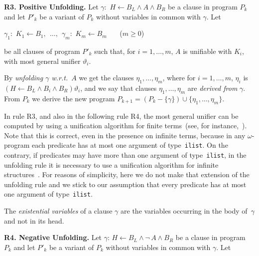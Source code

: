 \documentclass[english]{tlp}
\begin{document}
\medskip

\noindent \textbf{R3. Positive Unfolding.} Let \( \gamma :\, \,
H\leftarrow B_{L}\wedge A\wedge B_{R} \) be a clause in program \(
P_{k} \) and let \( P'_{k} \) be a variant of \( P_{k} \) without
variables in common with \( \gamma  \). Let

\smallskip

\( \gamma _{1}:\, \, K_{1}\leftarrow B_{1},
    \ \ \ldots,\ \
    \gamma _{m}:\, \, K_{m}\leftarrow B_{m} \) \ \ \ (\( m\geq 0 \))

\smallskip{}

\noindent be all clauses of program \( P'_{k} \) such that, for \(
i=1,\ldots ,m \), \( A \) is unifiable with \( K_i \), with most
general unifier \( \vartheta _{i}\).

\noindent By \emph{unfolding \( \gamma  \) w.r.t.~\( A \)} we get
the clauses $\eta _{1},\ldots ,\eta _{m}$, where for \( i=1,\ldots
,m \), \( \eta_{i} \) is \( (H\leftarrow B_{L}\wedge B_{i}\wedge
B_{R})\vartheta _{i} \), and we say that clauses $\eta _{1},\ldots
,\eta _{m}$ are {\it{derived from}} $\gamma $. From \( P_{k} \) we
derive the new program \(P_{k+1}=(P_{k}-\{\gamma \})\cup \{\eta
_{1},\ldots ,\eta _{m}\}\).

\medskip{}

In rule R3, and also in the following rule R4, the 
most general unifier can be computed by using a unification
algorithm for finite terms~(see, for instance,~\cite{Llo87}). 
Note that 
this is correct, even in the presence on infinite terms, 
because in any $\omega$-program
each predicate has at most one argument of type~\texttt{ilist}.
On the contrary, if predicates may have
more than one argument of type~\texttt{ilist},
in the unfolding rule it is necessary to use 
a unification algorithm for infinite structures~\cite{Col82}.
For reasons of simplicity, here
we do not make that extension of the unfolding rule
and we stick to our assumption
that every predicate has at most one argument of type~\texttt{ilist}.

\medskip

The {\em existential variables} of a clause $\gamma$ are the
variables occurring in the body of~$\gamma$ and not in its head.

\medskip

\noindent \textbf{R4. Negative Unfolding.}\label{rule:neg-unfold}
Let $\gamma$: $H\leftarrow B_{L}\wedge \neg\,A\wedge B_{R}$ be a
clause in program $P_{k}$ and let $P'_{k}$ be a variant of $P_{k}$
without variables in common with $\gamma $. Let
\end{document}
